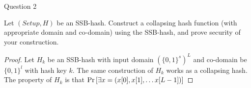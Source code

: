 \begin{solution}{Question 2}\label{ques:2}
    \begin{question}
    Let $(Setup, H )$ be an SSB-hash. Construct a collapsing hash function (with appropriate domain and co-domain) using the SSB-hash, and prove security of your construction.
    \end{question}
    \tcblower{}
    \begin{proof}
    Let $H_k$ be an SSB-hash with input domain $(\{0,1\}^s)^L$ and co-domain be $\{0,1\}^l$ with hash key $k$. The same construction of $H_k$ works as a collapsing hash. The property of $H_k$ is that $\Pr\left[ \exists x = (x[0], x[1], \ldots x[L-1]) \right]$
    \end{proof}
\end{solution}
 